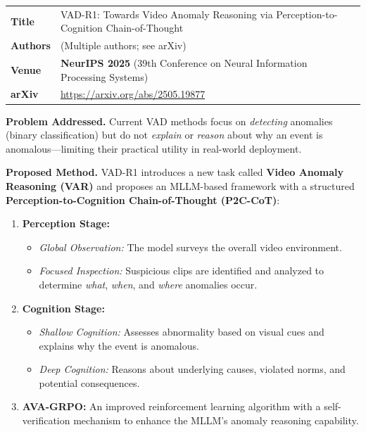 \documentclass[12pt, a4paper]{article}
\begin{document}
\begin{tabularx}{\textwidth}{@{}l X@{}}
    \toprule
    \textbf{Title}   & VAD-R1: Towards Video Anomaly Reasoning via Perception-to-Cognition Chain-of-Thought \\
    \textbf{Authors}  & (Multiple authors; see arXiv) \\
    \textbf{Venue}    & \textbf{NeurIPS 2025} (39th Conference on Neural Information Processing Systems) \\
    \textbf{arXiv}    & \url{https://arxiv.org/abs/2505.19877} \\
    \bottomrule
\end{tabularx}

\vspace{0.8em}

\textbf{Problem Addressed.}
Current VAD methods focus on \textit{detecting} anomalies (binary classification) but do not \textit{explain} or \textit{reason} about why an event is anomalous---limiting their practical utility in real-world deployment.

\textbf{Proposed Method.}
VAD-R1 introduces a new task called \textbf{Video Anomaly Reasoning (VAR)} and proposes an MLLM-based framework with a structured \textbf{Perception-to-Cognition Chain-of-Thought (P2C-CoT)}:
\begin{enumerate}[leftmargin=1.5em]
    \item \textbf{Perception Stage:}
    \begin{itemize}
        \item \textit{Global Observation:} The model surveys the overall video environment.
        \item \textit{Focused Inspection:} Suspicious clips are identified and analyzed to determine \textit{what}, \textit{when}, and \textit{where} anomalies occur.
    \end{itemize}
    \item \textbf{Cognition Stage:}
    \begin{itemize}
        \item \textit{Shallow Cognition:} Assesses abnormality based on visual cues and explains why the event is anomalous.
        \item \textit{Deep Cognition:} Reasons about underlying causes, violated norms, and potential consequences.
    \end{itemize}
    \item \textbf{AVA-GRPO:} An improved reinforcement learning algorithm with a self-verification mechanism to enhance the MLLM's anomaly reasoning capability.
\end{enumerate}
\end{document}

